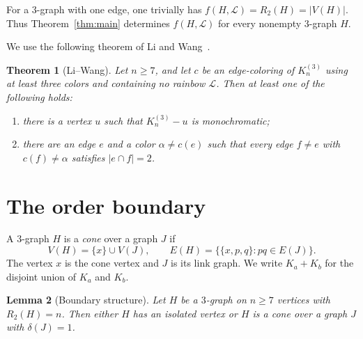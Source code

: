 \documentclass[11pt]{amsart}
\newtheorem{theorem}{Theorem}
\newtheorem{lemma}[theorem]{Lemma}
\newcommand{\Lpath}{\mathcal L}
\begin{document}
For a $3$-graph with one edge, one trivially has
$f(H,\Lpath)=R_2(H)=|V(H)|$. Thus Theorem~\ref{thm:main} determines
$f(H,\Lpath)$ for every nonempty $3$-graph $H$.

We use the following theorem of Li and Wang~\cite[Theorem~1.5]{LiWang}.

\begin{theorem}[Li--Wang]\label{thm:LW}
Let $n\ge7$, and let $c$ be an edge-coloring of $K_n^{(3)}$ using at
least three colors and containing no rainbow $\Lpath$. Then at least one
of the following holds:
\begin{enumerate}
\item there is a vertex $u$ such that $K_n^{(3)}-u$ is monochromatic;
\item there are an edge $e$ and a color $\alpha\ne c(e)$ such that every
edge $f\ne e$ with $c(f)\ne\alpha$ satisfies $|e\cap f|=2$.
\end{enumerate}
\end{theorem}

\section{The order boundary}

A $3$-graph $H$ is a \emph{cone} over a graph $J$ if
\[
  V(H)=\{x\}\cup V(J),
  \qquad
  E(H)=\bigl\{\{x,p,q\}:pq\in E(J)\bigr\}.
\]
The vertex $x$ is the cone vertex and $J$ is its link graph. We write
$K_a+K_b$ for the disjoint union of $K_a$ and $K_b$.

\begin{lemma}[Boundary structure]\label{lem:boundary}
Let $H$ be a $3$-graph on $n\ge7$ vertices with $R_2(H)=n$. Then either
$H$ has an isolated vertex or $H$ is a cone over a graph $J$ with
$\delta(J)=1$.
\end{lemma}
\end{document}
